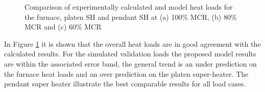 \documentclass[review]{elsarticle}
\begin{document}
\begin{figure}[h!]
\caption{Comparison of experimentally calculated and model heat loads for the furnace, platen SH and pendant SH at (a) 100\% MCR, (b) 80\% MCR and (c) 60\% MCR}
\label{fig_heat_valid}
\end{figure}
\clearpage
In Figure \ref{fig_heat_valid} it is shown that the overall heat loads are in good agreement with the calculated results. For the simulated validation loads the proposed model results are within the associated error band, the general trend is an under prediction on the furnace heat loads and an over prediction on the platen super-heater. The pendant super heater illustrate the best comparable results for all load cases.
\end{document}
